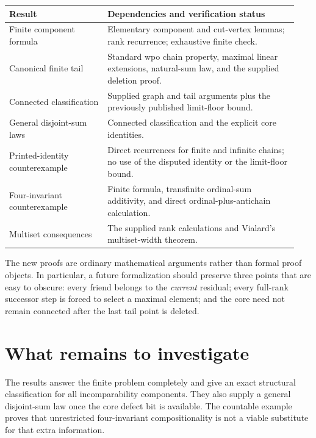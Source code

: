 \documentclass[11pt,a4paper]{article}
\theoremstyle{definition}
\theoremstyle{remark}
\begin{document}
\begin{center}
\small
\begin{tabular}{@{}p{0.32\linewidth}p{0.62\linewidth}@{}}
\toprule
Result & Dependencies and verification status\\
\midrule
Finite component formula & Elementary component and cut-vertex lemmas;
rank recurrence; exhaustive finite check.\\[3pt]
Canonical finite tail & Standard wpo chain property, maximal linear
extensions, natural-sum law, and the supplied deletion proof.\\[3pt]
Connected classification & Supplied graph and tail arguments plus the
previously published limit-floor bound.\\[3pt]
General disjoint-sum laws & Connected classification and the explicit
core identities.\\[3pt]
Printed-identity counterexample & Direct recurrences for finite and
infinite chains; no use of the disputed identity or the limit-floor bound.\\[3pt]
Four-invariant counterexample & Finite formula, transfinite ordinal-sum
additivity, and direct ordinal-plus-antichain calculation.\\[3pt]
Multiset consequences & The supplied rank calculations and Vialard's
multiset-width theorem.\\
\bottomrule
\end{tabular}
\end{center}

The new proofs are ordinary mathematical arguments rather than formal
proof objects. In particular, a future formalization should preserve three
points that are easy to obscure: every friend belongs to the \emph{current}
residual; every full-rank successor step is forced to select a maximal
element; and the core need not remain connected after the last tail point
is deleted.

\section{What remains to investigate}\label{sec:future}

The results answer the finite problem completely and give an exact
structural classification for all incomparability components. They also
supply a general disjoint-sum law once the core defect bit is available.
The countable example proves that unrestricted four-invariant
compositionality is not a viable substitute for that extra information.
\end{document}
